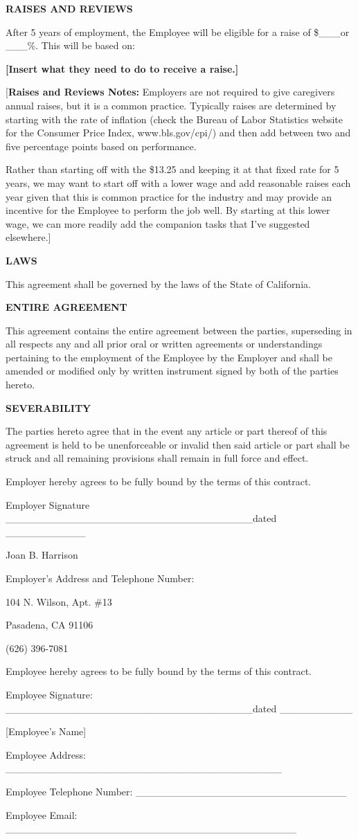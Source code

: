 \documentclass[]{article}
\newcommand{\mom}{Joan B. Harrison}
\begin{document}
\textbf{RAISES AND REVIEWS}

After 5 years of employment, the Employee will be eligible for a raise
of \$\_\_\_or \_\_\_\%. This will be based on:

\textbf{{[}Insert what they need to do to receive a raise.{]}}

{[}\textbf{Raises and Reviews Notes:} Employers are not required to give
caregivers annual raises, but it is a common practice. Typically raises
are determined by starting with the rate of inflation (check the Bureau
of Labor Statistics website for the Consumer Price Index,
www.bls.gov/cpi/) and then add between two and five percentage points
based on performance.

Rather than starting off with the \$13.25 and keeping it at that fixed
rate for 5 years, we may want to start off with a lower wage and add
reasonable raises each year given that this is common practice for the
industry and may provide an incentive for the Employee to perform the
job well. By starting at this lower wage, we can more readily add the
companion tasks that I've suggested elsewhere.{]}

\textbf{LAWS}

This agreement shall be governed by the laws of the State of California.

\textbf{ENTIRE AGREEMENT}

This agreement contains the entire agreement between the parties,
superseding in all respects any and all prior oral or written agreements
or understandings pertaining to the employment of the Employee by the
Employer and shall be amended or modified only by written instrument
signed by both of the parties hereto.

\textbf{SEVERABILITY}

The parties hereto agree that in the event any article or part thereof
of this agreement is held to be unenforceable or invalid then said
article or part shall be struck and all remaining provisions shall
remain in full force and effect.

Employer hereby agrees to be fully bound by the terms of this contract.

Employer Signature
\_\_\_\_\_\_\_\_\_\_\_\_\_\_\_\_\_\_\_\_\_\_\_\_\_\_\_\_\_\_\_\_\_\_dated
\_\_\_\_\_\_\_\_\_\_\_

\mom{}

Employer's Address and Telephone Number:

104 N. Wilson, Apt. \#13

Pasadena, CA 91106

(626) 396-7081

Employee hereby agrees to be fully bound by the terms of this contract.

Employee Signature:
\_\_\_\_\_\_\_\_\_\_\_\_\_\_\_\_\_\_\_\_\_\_\_\_\_\_\_\_\_\_\_\_\_\_dated
\_\_\_\_\_\_\_\_\_\_

{[}Employee's Name{]}

Employee Address:
\_\_\_\_\_\_\_\_\_\_\_\_\_\_\_\_\_\_\_\_\_\_\_\_\_\_\_\_\_\_\_\_\_\_\_\_\_\_

Employee Telephone Number:
\_\_\_\_\_\_\_\_\_\_\_\_\_\_\_\_\_\_\_\_\_\_\_\_\_\_\_\_\_

Employee Email:
\_\_\_\_\_\_\_\_\_\_\_\_\_\_\_\_\_\_\_\_\_\_\_\_\_\_\_\_\_\_\_\_\_\_\_\_\_\_\_\_
\end{document}
